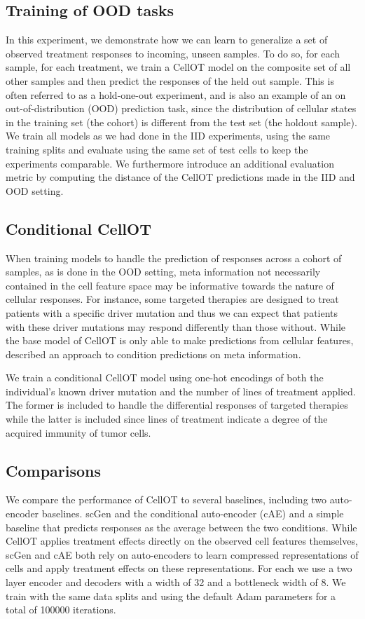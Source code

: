 \subsection{Training of OOD tasks}
In this experiment, we demonstrate how we can learn to generalize a set of observed treatment responses to incoming, unseen samples. To do so,  for each sample, for each treatment, we train a CellOT model on the composite set of all other samples and then predict the responses of the held out sample. This is often referred to as a hold-one-out experiment, and is also an example of an on out-of-distribution (OOD) prediction task, since the distribution of cellular states in the training set (the cohort) is different from the test set (the holdout sample). We train all models as we had done in the IID experiments, using the same training splits and evaluate using the same set of test cells to keep the experiments comparable.  We furthermore introduce an additional evaluation metric by computing the distance of the CellOT predictions made in the IID and OOD setting.

\subsection{Conditional CellOT}
When training models to handle the prediction of responses across a cohort of samples, as is done in the OOD setting, meta information not necessarily contained in the cell feature space may be informative towards the nature of cellular responses. For instance, some targeted therapies are designed to treat patients with a specific driver mutation and thus we can expect that patients with these driver mutations may respond differently than those without. While the base model of CellOT is only able to make predictions from cellular features, \cite{bunne2022} described an approach to condition predictions on meta information.

We train a conditional CellOT model using one-hot encodings of both the individual’s known driver mutation and the number of lines of treatment applied. The former is included to handle the differential responses of targeted therapies while the latter is included since lines of treatment indicate a degree of the acquired immunity of tumor cells.

\subsection{Comparisons}
We compare the performance of CellOT to several baselines, including two auto-encoder baselines. scGen \cite{lotfollahi2019} and the conditional auto-encoder (cAE) \cite{lopez2018} and a simple baseline that predicts responses as the average between the two conditions. While CellOT applies treatment effects directly on the observed cell features themselves, scGen and cAE both rely on auto-encoders to learn compressed representations of cells and apply treatment effects on these representations. For each we use a two layer encoder and decoders with a width of 32 and a bottleneck width of 8. We train with the same data splits and using the default Adam parameters for a total of 100000 iterations.
